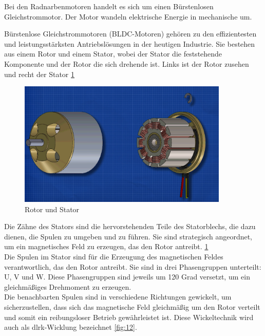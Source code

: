 Bei den Radnarbenmotoren handelt es sich um einen Bürstenlosen Gleichstrommotor.
Der Motor wandeln elektrische Energie in mechanische um.

Bürstenlose Gleichstrommotoren (BLDC-Motoren) gehören zu den effizientesten und leistungsstärksten Antriebslösungen in der heutigen Industrie.
Sie bestehen aus einem Rotor und einem Stator, wobei der Stator die feststehende Komponente und der Rotor die sich drehende ist.
Links ist der Rotor zusehen und recht der Stator \ref{fig:11}

\begin{figure}[h]
    \centering
    \includegraphics[width=10cm]{images/RotorStator.png}
    \caption{Rotor und Stator\cite{ingenieursmentalitat_burstenloser_2022}}%
    \label{fig:11}
\end{figure}

Die Zähne des Stators sind die hervorstehenden Teile des Statorblechs, die dazu dienen, die Spulen zu umgeben und zu führen.
Sie sind strategisch angeordnet, um ein magnetisches Feld zu erzeugen, das den Rotor antreibt.  \ref{fig:11}\\

Die Spulen im Stator sind für die Erzeugung des magnetischen Feldes verantwortlich, das den Rotor antreibt.
Sie sind in drei Phasengruppen unterteilt: U, V und W. Diese Phasengruppen sind jeweils um 120 Grad versetzt, um ein gleichmäßiges Drehmoment zu erzeugen.\\

Die benachbarten Spulen sind in verschiedene Richtungen gewickelt, um sicherzustellen, dass sich das magnetische Feld gleichmäßig um den Rotor verteilt und somit ein reibungsloser Betrieb gewährleistet ist.
Diese Wickeltechnik wird auch als dlrk-Wicklung bezeichnet \ref{fig:12}.\\

